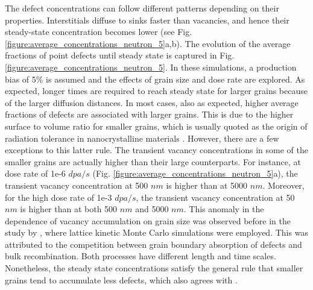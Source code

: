 \documentclass[utf8]{frontiersSCNS} %
\begin{document}
    The defect concentrations can follow different patterns depending on their properties. Interstitials diffuse to sinks faster than vacancies, and hence their steady-state concentration becomes lower (see Fig. \ref{figure:average_concentrations_neutron_5}a,b).  The evolution of the average fractions of point defects until steady state is captured in Fig. \ref{figure:average_concentrations_neutron_5}.  In these simulations, a production bias of 5\% is assumed and the effects of grain size and dose rate are explored. As expected, longer times are required to reach steady state for larger grains because of the larger diffusion distances. In most cases, also as expected, higher average fractions of defects are associated with larger grains. This is due to the higher surface to volume ratio for smaller grains, which is usually quoted as the origin of radiation tolerance in nanocrystalline materials \citep{was2017,yang2010,demkowicz2011}. However, there are a few exceptions to this latter rule. The transient vacancy concentrations in some of the smaller grains are actually higher than their large counterparts.  For instance, at dose rate of 1e-6 $dpa/s$ (Fig. \ref{figure:average_concentrations_neutron_5}a), the transient vacancy concentration at 500 $nm$ is higher than at 5000 $nm$. Moreover, for the high dose rate of 1e-3 $dpa/s$, the transient vacancy concentration at 50 $nm$ is higher than at both 500 $nm$ and 5000 $nm$. This anomaly in the dependence of vacancy accumulation on grain size was observed before in the study by \citep{yang2010}, where lattice kinetic Monte Carlo simulations were employed. This was attributed to the competition between grain boundary absorption of defects and bulk recombination. Both processes have different length and time scales. Nonetheless, the steady state concentrations satisfy the general rule that smaller grains tend to accumulate less defects, which also agrees with \citep{yang2010}.
    
\end{document}
